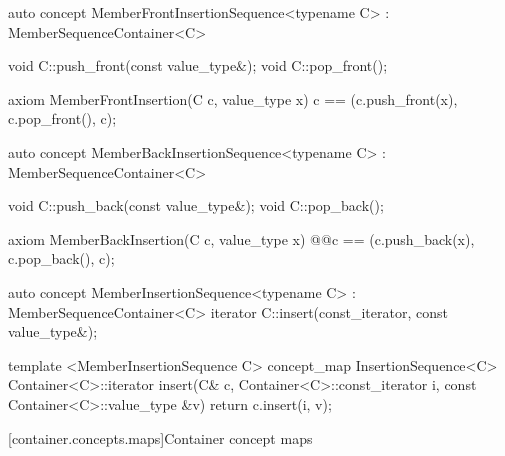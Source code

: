 \documentclass[american,twoside]{book}
\begin{document}
\begin{itemdecl}
auto concept MemberFrontInsertionSequence<typename C> : MemberSequenceContainer<C> {
  void C::push_front(const value_type&);
  void C::pop_front();

  axiom MemberFrontInsertion(C c, value_type x) {
    c == (c.push_front(x), c.pop_front(), c);
  }
}
\end{itemdecl}


\begin{itemdescr}
\pnum
{}
\end{itemdescr}

\begin{itemdecl}
auto concept MemberBackInsertionSequence<typename C> : MemberSequenceContainer<C> {
  void C::push_back(const value_type&);
  void C::pop_back();

  axiom MemberBackInsertion(C c, value_type x) {
    @\textcolor{addclr}{}@c == (c.push_back(x), c.pop_back(), c);
  }
}
\end{itemdecl}


\begin{itemdescr}
\pnum
{}
\end{itemdescr}


\begin{itemdecl}
auto concept MemberInsertionSequence<typename C> : MemberSequenceContainer<C> {
  iterator C::insert(const_iterator, const value_type&);
}
\end{itemdecl}

\begin{itemdecl}
template <MemberInsertionSequence C> 
concept_map InsertionSequence<C> {
  Container<C>::iterator insert(C& c, Container<C>::const_iterator i, const Container<C>::value_type &v)    
  { return c.insert(i, v); }
}			
\end{itemdecl}

\begin{itemdescr}
\pnum
{}
\end{itemdescr}

[container.concepts.maps]{Container concept maps}
\end{document}
